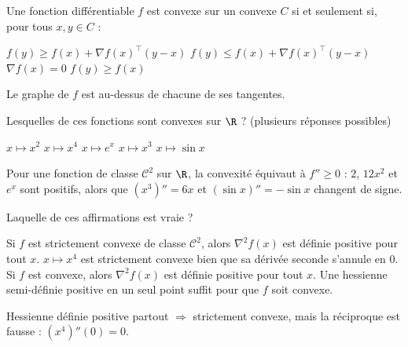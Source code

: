 
\begin{question}
Une fonction différentiable $f$ est convexe sur un convexe $C$ si et seulement si, pour tous $x,y\in C$ :
\begin{reponses}
  \bonne $f(y)\ge f(x)+\nabla f(x)^{\top}(y-x)$
  \mauvaise $f(y)\le f(x)+\nabla f(x)^{\top}(y-x)$
  \mauvaise $\nabla f(x)=0$
  \mauvaise $f(y)\ge f(x)$
\end{reponses}
\begin{explication}
Le graphe de $f$ est au-dessus de chacune de ses tangentes.
\end{explication}
\end{question}

\begin{question}
Lesquelles de ces fonctions sont convexes sur $\R$ ? (plusieurs réponses possibles)
\begin{reponses}
  \bonne $x\mapsto x^2$
  \bonne $x\mapsto x^4$
  \bonne $x\mapsto e^{x}$
  \mauvaise $x\mapsto x^3$
  \mauvaise $x\mapsto\sin x$
\end{reponses}
\begin{explication}
Pour une fonction de classe $\mathcal C^2$ sur $\R$, la convexité équivaut à $f''\ge0$ : $2$, $12x^2$ et $e^x$ sont positifs, alors que $(x^3)''=6x$ et $(\sin x)''=-\sin x$ changent de signe.
\end{explication}
\end{question}

\begin{question}
Laquelle de ces affirmations est vraie ?
\begin{reponses}
  \mauvaise Si $f$ est strictement convexe de classe $\mathcal C^2$, alors $\nabla^2f(x)$ est définie positive pour tout $x$.
  \bonne $x\mapsto x^4$ est strictement convexe bien que sa dérivée seconde s'annule en $0$.
  \mauvaise Si $f$ est convexe, alors $\nabla^2f(x)$ est définie positive pour tout $x$.
  \mauvaise Une hessienne semi-définie positive en un seul point suffit pour que $f$ soit convexe.
\end{reponses}
\begin{explication}
Hessienne définie positive partout $\Rightarrow$ strictement convexe, mais la réciproque est fausse : $(x^4)''(0)=0$.
\end{explication}
\end{question}

